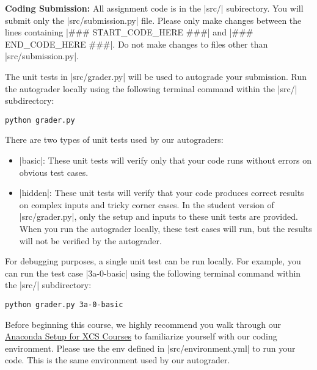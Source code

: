 {\bf Coding Submission:}
All assignment code is in the |src/| subirectory.  You will submit only the
|src/submission.py| file.  Please only make changes between the lines containing
|### START_CODE_HERE ###| and |### END_CODE_HERE ###|. Do not make changes to
files other than |src/submission.py|.

The unit tests in |src/grader.py| will be used to autograde your submission.
Run the autograder locally using the following terminal command within the
|src/| subdirectory:
\begin{lstlisting}
python grader.py
\end{lstlisting}

There are two types of unit tests used by our autograders:
\begin{itemize}
  \item |basic|:  These unit tests will verify only that your code runs without
  errors on obvious test cases.
  \item |hidden|: These unit tests will verify that your code produces correct
  results on complex inputs and tricky corner cases.  In the student version of
  |src/grader.py|, only the setup and inputs to these unit tests are provided.
  When you run the autograder locally, these test cases will run, but the
  results will not be verified by the autograder.
\end{itemize}

For debugging purposes, a single unit test can be run locally.  For example, you
can run the test case |3a-0-basic| using the following terminal command within
the |src/| subdirectory:
\begin{lstlisting}
python grader.py 3a-0-basic
\end{lstlisting}

Before beginning this course, we highly recommend you walk through our
\href{https://learning.stanford.edu/online/pluginfile.php/123352/mod_resource/content/19/Conda_Tutorial.pdf}{Anaconda
Setup for XCS Courses} to familiarize yourself with
our coding environment.  Please use the env defined in |src/environment.yml|
to run your code.  This is the same environment used by our autograder.
